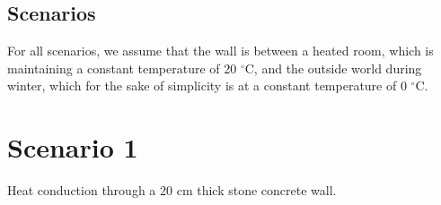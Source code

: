 \newpage
\subsection{Scenarios}

For all scenarios, we assume that the wall is between a heated room, which is maintaining a constant temperature of 20 $^{\circ}$C, and the outside world during winter, which for the sake of simplicity is at a constant temperature of 0 $^{\circ}$C.

\begin{table}[!h]\caption{\label{tab_heat}Material properties needed for scenarios.}
\end{table}


\section*{Scenario 1}

Heat conduction through a 20 cm thick stone concrete wall. 

